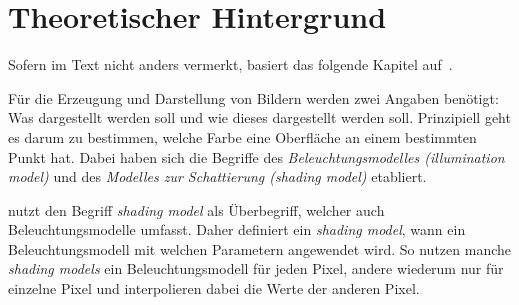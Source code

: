 
\chapter{Theoretischer Hintergrund}
\label{chap:theoretical_background}

Sofern im Text nicht anders vermerkt, basiert das folgende Kapitel
auf~\cite[S. 721ff]{foley_computer_1996}.

Für die Erzeugung und Darstellung von Bildern werden zwei Angaben
benötigt: Was dargestellt werden soll und wie dieses dargestellt werden
soll.
Prinzipiell geht es darum zu bestimmen, welche Farbe eine Oberfläche an
einem bestimmten Punkt hat. Dabei haben sich die Begriffe des
\textit{Beleuchtungsmodelles (illumination model)} und des
\textit{Modelles zur Schattierung (shading model)} etabliert.

\citeauthor{foley_computer_1996} nutzt den Begriff \textit{shading model} als
Überbegriff, welcher auch Beleuchtungsmodelle umfasst. Daher definiert ein
\textit{shading model}, wann ein Beleuchtungsmodell mit welchen
Parametern angewendet wird. So nutzen manche \textit{shading models} ein
Beleuchtungsmodell für jeden Pixel, andere wiederum nur für einzelne Pixel und
interpolieren dabei die Werte der anderen Pixel.




